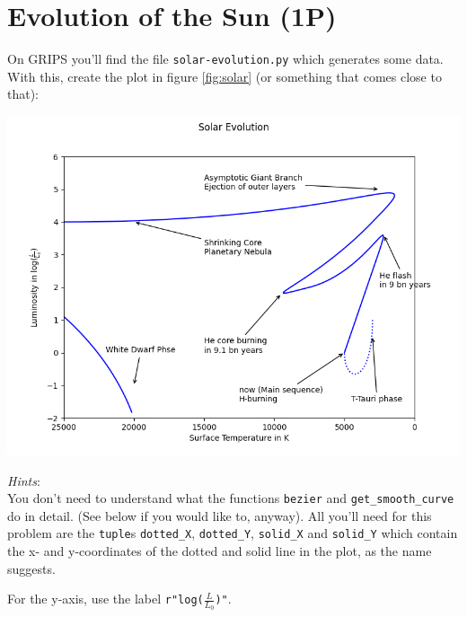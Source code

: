 \documentclass[
	english,
	fontsize=10pt,
	parskip=half,
	titlepage=true,
	DIV=12
]{scrartcl}
\newcommand*{\inPy}[1]{\texttt{#1}}
\begin{document}
\section{Evolution of the Sun (1\;P)}
On GRIPS you'll find the file \texttt{solar-evolution.py} which generates some data. With this, create the plot in figure \ref{fig:solar} (or something that comes close to that):
\begin{center}
\includegraphics[width=.8\linewidth]{./task3}
\label{fig:solar}
\end{center}

\emph{Hints}:\\
You don't need to understand what the functions \texttt{bezier} and \texttt{get\_smooth\_curve} do in detail. (See below if you would like to, anyway). All you'll need for this problem are the \inPy{tuple}s \texttt{dotted\_X}, \texttt{dotted\_Y}, \texttt{solid\_X} and \texttt{solid\_Y} which contain the x- and y-coordinates of the dotted and solid line in the plot, as the name suggests.

For the y-axis, use the label \inPy{r"log($\frac{L}{L_0}$)"}.
\end{document}
